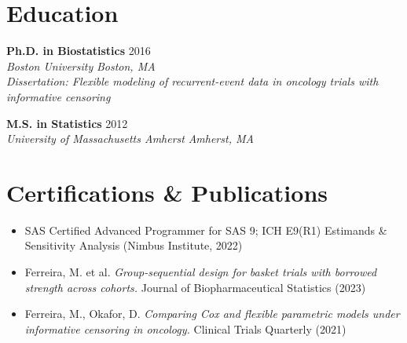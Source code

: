 \documentclass[9.5pt,letterpaper]{article}
\newcommand{\edu}[4]{%
  \textbf{#1} \hfill {\small\color{slategray} #2}\\
  {\itshape\color{signalteal} #3} \hfill {\small\itshape\color{slategray} #4}\\[0pt]
}
\begin{document}
\section*{Education}
\edu{Ph.D. in Biostatistics}{2016}{Boston University}{Boston, MA}
\textit{\small Dissertation: Flexible modeling of recurrent-event data in oncology trials with informative censoring}

\vspace{1pt}
\edu{M.S. in Statistics}{2012}{University of Massachusetts Amherst}{Amherst, MA}

\section*{Certifications \& Publications}
\begin{itemize}
  \item SAS Certified Advanced Programmer for SAS 9; ICH E9(R1) Estimands \& Sensitivity Analysis (Nimbus Institute, 2022)
  \item Ferreira, M. et al. \textit{Group-sequential design for basket trials with borrowed strength across cohorts.} Journal of Biopharmaceutical Statistics (2023)
  \item Ferreira, M., Okafor, D. \textit{Comparing Cox and flexible parametric models under informative censoring in oncology.} Clinical Trials Quarterly (2021)
\end{itemize}
\end{document}
